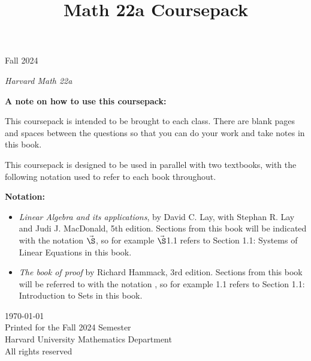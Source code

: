 \documentclass[12pt,letterpaper]{article}
\title{\Huge \textbf{Math 22a Coursepack}}
\date{}
\begin{document}

\maketitle






\centerline{\Large Fall 2024}

\vfill
\centerline{\textcopyright{} \emph{Harvard Math 22a}}


\pagebreak

\null


\centerline{\large\textbf{A note on how to use this coursepack:}  }
This coursepack is intended to be brought to each class. There are blank pages and spaces between the questions so that you can do your work and take notes in this book.

This coursepack is designed to be used in parallel with two textbooks, with the following notation used to refer to each book throughout.

{\large \textbf{Notation:}}

\begin{itemize}
\item[\Large$\vec\S$]
\emph{Linear Algebra and its applications}, by David C. Lay, with Stephan R. Lay and Judi J. MacDonald, 5th edition.  Sections from this book will be indicated with the notation $\vec{\S}$, so for example $\vec{\S}$1.1 refers to Section 1.1: Systems of Linear Equations in this book.

\item[\Large\framebox{\S}]
\emph{The book of proof} by Richard Hammack, 3rd edition.  Sections from this book will be referred to with the notation \framebox{\S}, so for example \framebox{\S}1.1 refers to Section 1.1: Introduction to Sets in this book. 
\end{itemize}

\vfill

{\footnotesize
\today\\
Printed for the Fall 2024 Semester\\
Harvard University Mathematics Department\\
All rights reserved
}
\end{document}

